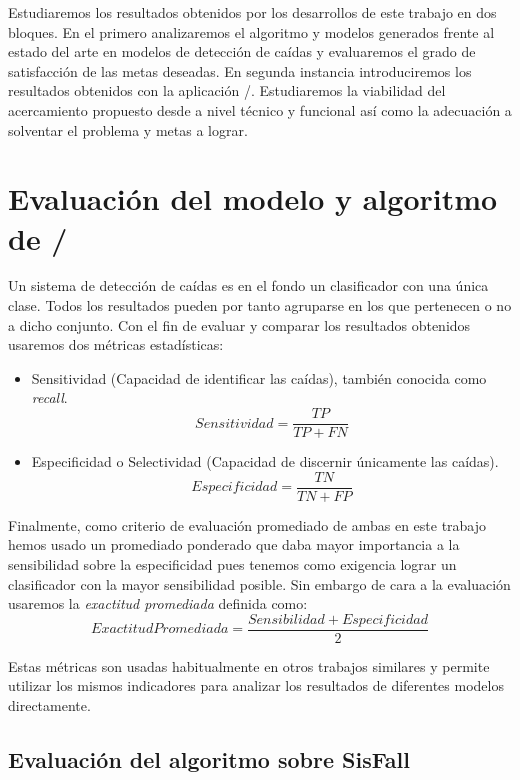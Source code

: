 
Estudiaremos los resultados obtenidos por los desarrollos de este trabajo en dos bloques. En el primero analizaremos el algoritmo y modelos generados frente al estado del arte en modelos de detección de caídas y evaluaremos el grado de satisfacción de las metas deseadas. En segunda instancia introduciremos los resultados obtenidos con la aplicación \ifell/. Estudiaremos la viabilidad del acercamiento propuesto desde a nivel técnico y funcional así como la adecuación a solventar el problema y metas a lograr.

\section{Evaluación del modelo y algoritmo de \ifell/}

Un sistema de detección de caídas es en el fondo un clasificador con una única clase. Todos los resultados pueden por tanto agruparse en los que pertenecen o no a dicho conjunto. Con el fin de evaluar y comparar los resultados obtenidos usaremos dos métricas estadísticas:
\begin{itemize}
  \item Sensitividad (Capacidad de identificar las caídas), también conocida como \textit{recall}.
  \[
    Sensitividad = \frac{TP}{TP+FN}
  \]
  \item Especificidad o Selectividad (Capacidad de discernir únicamente las caídas).
  \[
    Especificidad = \frac{TN}{TN+FP}
  \]
\end{itemize}

Finalmente, como criterio de evaluación promediado de ambas en este trabajo hemos usado un promediado ponderado que daba mayor importancia a la sensibilidad sobre la especificidad pues tenemos como exigencia lograr un clasificador con la mayor sensibilidad posible. Sin embargo de cara a la evaluación usaremos la \textit{exactitud promediada} definida como:\[
  ExactitudPromediada=\frac{Sensibilidad+Especificidad}{2}
\]

Estas métricas son usadas habitualmente en otros trabajos similares\cite{Noury2007,Chen2005, Bourke2006} y permite utilizar los mismos indicadores para analizar los resultados de diferentes modelos directamente.

\subsection{Evaluación del algoritmo sobre SisFall}\label{sub:eval:hibrido}

